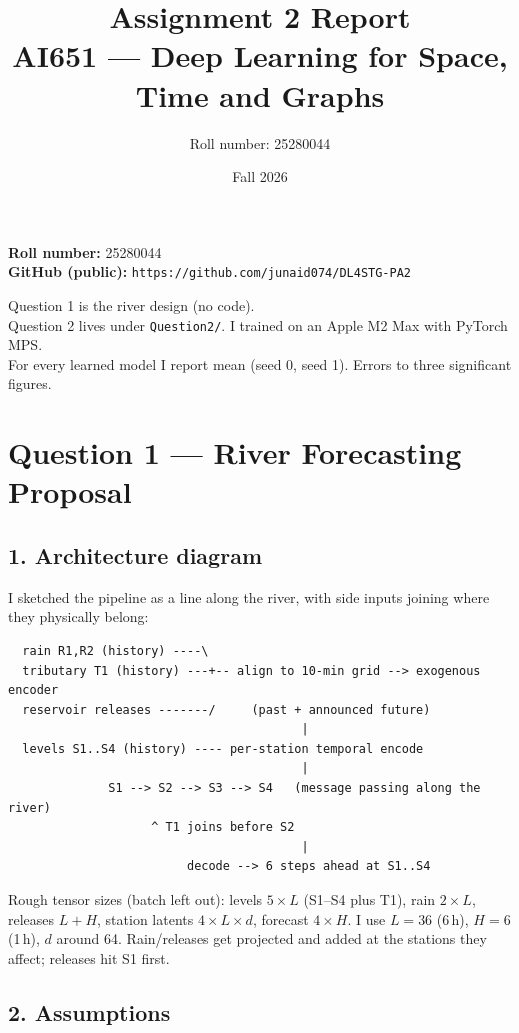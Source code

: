 \documentclass[11pt,a4paper]{article}
\title{Assignment 2 Report\\[0.2em]\large AI651 --- Deep Learning for Space, Time and Graphs}
\author{Roll number: 25280044}
\date{Fall 2026}
\begin{document}
\maketitle

\noindent
\textbf{Roll number:} 25280044\\
\textbf{GitHub (public):} \texttt{https://github.com/junaid074/DL4STG-PA2}

\vspace{0.3em}
\noindent
Question 1 is the river design (no code).\\
Question 2 lives under \texttt{Question2/}. I trained on an Apple M2 Max with PyTorch MPS.\\
For every learned model I report mean (seed 0, seed 1). Errors to three significant figures.

\section{Question 1 --- River Forecasting Proposal}

\subsection{1. Architecture diagram}

I sketched the pipeline as a line along the river, with side inputs joining where they physically belong:

\begin{verbatim}
  rain R1,R2 (history) ----\
  tributary T1 (history) ---+-- align to 10-min grid --> exogenous encoder
  reservoir releases -------/     (past + announced future)
                                         |
  levels S1..S4 (history) ---- per-station temporal encode
                                         |
              S1 --> S2 --> S3 --> S4   (message passing along the river)
                    ^ T1 joins before S2
                                         |
                         decode --> 6 steps ahead at S1..S4
\end{verbatim}

Rough tensor sizes (batch left out): levels $5\times L$ (S1--S4 plus T1), rain $2\times L$, releases $L+H$, station latents $4\times L\times d$, forecast $4\times H$. I use $L=36$ (6\,h), $H=6$ (1\,h), $d$ around 64. Rain/releases get projected and added at the stations they affect; releases hit S1 first.

\subsection{2. Assumptions}
\end{document}
